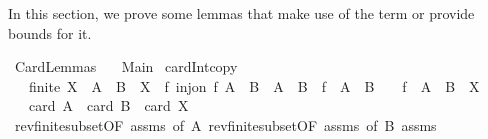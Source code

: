 %
\begin{isabellebody}%
%
%
\isadelimdocument
%
\endisadelimdocument
%
\isatagdocument
%
\isamarkuptrue%
%
\endisatagdocument
{\isafolddocument}%
%
\isadelimdocument
%
\endisadelimdocument
%
\begin{isamarkuptext}%
In this section, we prove some lemmas that make use of the term  or provide bounds for it.%
\end{isamarkuptext}\isamarkuptrue%
%
\isadelimtheory
%
\endisadelimtheory
%
\isatagtheory
{}\isamarkupfalse%
\ Card{\isacharunderscore}{\kern0pt}Lemmas\isanewline
\ \ \ Main\isanewline
{}%
\endisatagtheory
{\isafoldtheory}%
%
\isadelimtheory
%
\endisadelimtheory
\isanewline
\isanewline
{}\isamarkupfalse%
\ card{\isacharunderscore}{\kern0pt}Int{\isacharunderscore}{\kern0pt}copy{\isacharcolon}{\kern0pt}\isanewline
\ \ \ {\isachardoublequoteopen}finite\ X{\isachardoublequoteclose}\ \ {\isachardoublequoteopen}A\ {\isasymunion}\ B\ {\isasymsubseteq}\ X{\isachardoublequoteclose}\ \ {\isachardoublequoteopen}{\isasymexists}f{\isachardot}{\kern0pt}\ inj{\isacharunderscore}{\kern0pt}on\ f\ {\isacharparenleft}{\kern0pt}A\ {\isasyminter}\ B{\isacharparenright}{\kern0pt}\ {\isasymand}\ {\isacharparenleft}{\kern0pt}A\ {\isasymunion}\ B{\isacharparenright}{\kern0pt}\ {\isasyminter}\ {\isacharparenleft}{\kern0pt}f\ {\isacharbackquote}{\kern0pt}\ {\isacharparenleft}{\kern0pt}A\ {\isasyminter}\ B{\isacharparenright}{\kern0pt}{\isacharparenright}{\kern0pt}\ {\isacharequal}{\kern0pt}\ {\isacharbraceleft}{\kern0pt}{\isacharbraceright}{\kern0pt}\ {\isasymand}\ f\ {\isacharbackquote}{\kern0pt}\ {\isacharparenleft}{\kern0pt}A\ {\isasyminter}\ B{\isacharparenright}{\kern0pt}\ {\isasymsubseteq}\ X{\isachardoublequoteclose}\isanewline
\ \ \ {\isachardoublequoteopen}card\ A\ {\isacharplus}{\kern0pt}\ card\ B\ {\isasymle}\ card\ X{\isachardoublequoteclose}\isanewline
%
\isadelimproof
%
\endisadelimproof
%
\isatagproof
{}\isamarkupfalse%
\ {\isacharminus}{\kern0pt}\isanewline
\ \ \isamarkupfalse%
\ rev{\isacharunderscore}{\kern0pt}finite{\isacharunderscore}{\kern0pt}subset{\isacharbrackleft}{\kern0pt}OF\ assms{\isacharparenleft}{\kern0pt}{}{\isacharparenright}{\kern0pt}{\isacharcomma}{\kern0pt}\ of\ A{\isacharbrackright}{\kern0pt}\ rev{\isacharunderscore}{\kern0pt}finite{\isacharunderscore}{\kern0pt}subset{\isacharbrackleft}{\kern0pt}OF\ assms{\isacharparenleft}{\kern0pt}{}{\isacharparenright}{\kern0pt}{\isacharcomma}{\kern0pt}\ of\ B{\isacharbrackright}{\kern0pt}\ assms{\isacharparenleft}{\kern0pt}{}{\isacharparenright}{\kern0pt}\ \isanewline

\end{isabellebody}
